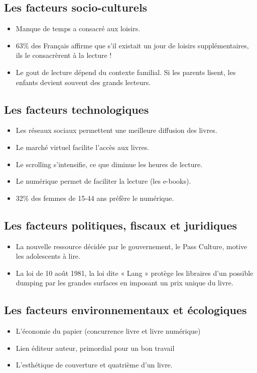 \documentclass[a4paper, 13pt]{article}
\begin{document}
\subsection{Les facteurs socio-culturels}
\begin{itemize}
    \item Manque de temps a consacré aux loisirs.
    \item 63\% des Français affirme que s’il existait un jour de loisirs supplémentaires, ils le consacrèrent à la lecture !
    \item Le gout de lecture dépend du contexte familial. Si les parents lisent, les enfants devient souvent des grands lecteurs.
\end{itemize}

\subsection{Les facteurs technologiques}
\begin{itemize}
    \item Les réseaux sociaux permettent une meilleure diffusion des livres.
    \item Le marché virtuel facilite l’accès aux livres.
    \item Le scrolling s’intensifie, ce que diminue les heures de lecture.
    \item Le numérique permet de faciliter la lecture (les e-books).
    \item 32\% des femmes de 15-44 ans préfère le numérique.
\end{itemize}

\subsection{Les facteurs politiques, fiscaux et juridiques}
\begin{itemize}
    \item La nouvelle ressource décidée par le gouvernement, le Pass Culture, motive les adolescents à lire.
    \item La loi de 10 août 1981, la loi dite « Lang » protège les libraires d’un possible dumping par les grandes surfaces en imposant un prix unique du livre.
\end{itemize}
\subsection{Les facteurs environnementaux et écologiques}
\begin{itemize}
    \item L’économie du papier (concurrence livre et livre numérique)
    \item Lien éditeur auteur, primordial pour un bon travail 
    \item L’esthétique de couverture et quatrième d’un livre.
\end{itemize}
\end{document}
